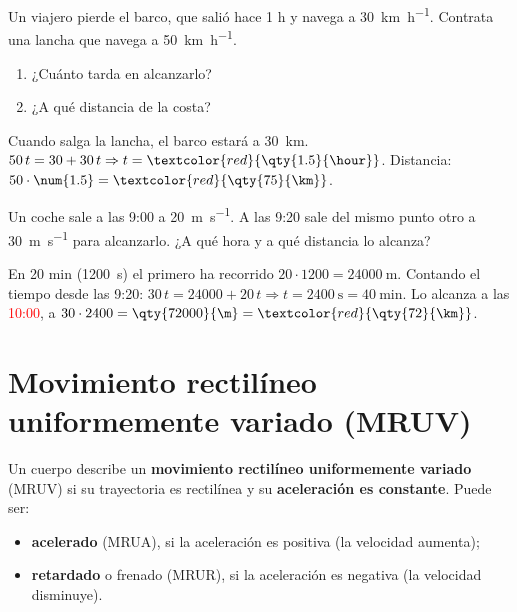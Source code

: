 \begin{exercise}
    Un viajero pierde el barco, que salió hace 1 h y navega a \qty{30}{\km\per\hour}. Contrata una lancha que navega a \qty{50}{\km\per\hour}.
    \begin{enumerate}[label=\alph*)]
        \item ¿Cuánto tarda en alcanzarlo?
        \item ¿A qué distancia de la costa?
    \end{enumerate}
    \begin{solu}
        Cuando salga la lancha, el barco estará a \qty{30}{\km}. \(50\,t = 30 + 30\,t \Rightarrow t = \textcolor{red}{\qty{1.5}{\hour}}\). Distancia: \(50 \cdot \num{1.5} = \textcolor{red}{\qty{75}{\km}}\).
    \end{solu}
\end{exercise}

\begin{exercise}
    Un coche sale a las 9:00 a \qty{20}{\m\per\s}. A las 9:20 sale del mismo punto otro a \qty{30}{\m\per\s} para alcanzarlo. ¿A qué hora y a qué distancia lo alcanza?
    \begin{solu}
        En 20 min (\qty{1200}{\s}) el primero ha recorrido \(20 \cdot 1200 = \qty{24000}{\m}\). Contando el tiempo desde las 9:20: \(30\,t = 24000 + 20\,t \Rightarrow t = \qty{2400}{\s} = \qty{40}{\minute}\). Lo alcanza a las \textcolor{red}{10:00}, a \(30 \cdot 2400 = \qty{72000}{\m} = \textcolor{red}{\qty{72}{\km}}\).
    \end{solu}
\end{exercise}

\section{Movimiento rectilíneo uniformemente variado (MRUV)}

Un cuerpo describe un \textbf{movimiento rectilíneo uniformemente variado} (MRUV) si su trayectoria es rectilínea y su \textbf{aceleración es constante}. Puede ser:
\begin{itemize}
    \item \textbf{acelerado} (MRUA), si la aceleración es positiva (la velocidad aumenta);
    \item \textbf{retardado} o frenado (MRUR), si la aceleración es negativa (la velocidad disminuye).
\end{itemize}


